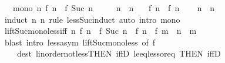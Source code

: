 \begin{isabellebody}
\ \ \ mono{\isacharcolon}{\kern0pt}\ {\isachardoublequoteopen}{\isasymAnd}n{\isachardot}{\kern0pt}\ f\ n\ {\isacharless}{\kern0pt}\ f\ {\isacharparenleft}{\kern0pt}Suc\ n{\isacharparenright}{\kern0pt}{\isachardoublequoteclose}\isanewline
\ \ \ \ \ {\isachardoublequoteopen}n\ {\isacharless}{\kern0pt}\ n{\isacharprime}{\kern0pt}{\isachardoublequoteclose}\isanewline
\ \ \ {\isachardoublequoteopen}f\ n\ {\isacharless}{\kern0pt}\ f\ n{\isacharprime}{\kern0pt}{\isachardoublequoteclose}\isanewline
%
\isadelimproof
\ \ %
\endisadelimproof
%
\isatagproof
{}\isamarkupfalse%
\ {\isacartoucheopen}n\ {\isacharless}{\kern0pt}\ n{\isacharprime}{\kern0pt}{\isacartoucheclose}\ \isamarkupfalse%
\ {\isacharparenleft}{\kern0pt}induct\ n\ n{\isacharprime}{\kern0pt}\ rule{\isacharcolon}{\kern0pt}\ less{\isacharunderscore}{\kern0pt}Suc{\isacharunderscore}{\kern0pt}induct{\isacharparenright}{\kern0pt}\ {\isacharparenleft}{\kern0pt}auto\ intro{\isacharcolon}{\kern0pt}\ mono{\isacharparenright}{\kern0pt}%
\endisatagproof
{\isafoldproof}%
%
\isadelimproof
\isanewline
%
\endisadelimproof
\isanewline
{}\isamarkupfalse%
\ lift{\isacharunderscore}{\kern0pt}Suc{\isacharunderscore}{\kern0pt}mono{\isacharunderscore}{\kern0pt}less{\isacharunderscore}{\kern0pt}iff{\isacharcolon}{\kern0pt}\ {\isachardoublequoteopen}{\isacharparenleft}{\kern0pt}{\isasymAnd}n{\isachardot}{\kern0pt}\ f\ n\ {\isacharless}{\kern0pt}\ f\ {\isacharparenleft}{\kern0pt}Suc\ n{\isacharparenright}{\kern0pt}{\isacharparenright}{\kern0pt}\ {\isasymLongrightarrow}\ f\ n\ {\isacharless}{\kern0pt}\ f\ m\ {\isasymlongleftrightarrow}\ n\ {\isacharless}{\kern0pt}\ m{\isachardoublequoteclose}\isanewline
%
\isadelimproof
\ \ %
\endisadelimproof
%
\isatagproof
{}\isamarkupfalse%
\ {\isacharparenleft}{\kern0pt}blast\ intro{\isacharcolon}{\kern0pt}\ less{\isacharunderscore}{\kern0pt}asym{\isacharprime}{\kern0pt}\ lift{\isacharunderscore}{\kern0pt}Suc{\isacharunderscore}{\kern0pt}mono{\isacharunderscore}{\kern0pt}less\ {\isacharbrackleft}{\kern0pt}of\ f{\isacharbrackright}{\kern0pt}\isanewline
\ \ \ \ dest{\isacharcolon}{\kern0pt}\ linorder{\isacharunderscore}{\kern0pt}not{\isacharunderscore}{\kern0pt}less{\isacharbrackleft}{\kern0pt}THEN\ iffD{}{\isacharbrackright}{\kern0pt}\ le{\isacharunderscore}{\kern0pt}eq{\isacharunderscore}{\kern0pt}less{\isacharunderscore}{\kern0pt}or{\isacharunderscore}{\kern0pt}eq\ {\isacharbrackleft}{\kern0pt}THEN\ iffD{}{\isacharbrackright}{\kern0pt}{\isacharparenright}{\kern0pt}%

\end{isabellebody}
